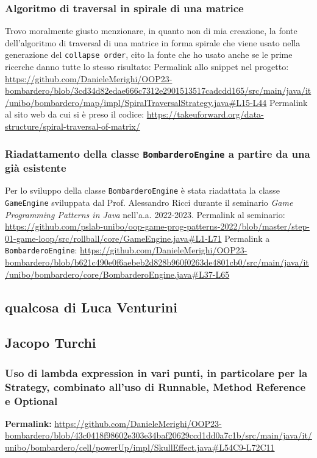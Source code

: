 \documentclass[a4paper,12pt]{report}
\begin{document}
\subsubsection{Algoritmo di traversal in spirale di una matrice}
Trovo moralmente giusto menzionare, in quanto non di mia creazione, la fonte dell'algoritmo di traversal di una matrice in forma spirale che viene usato nella generazione del \texttt{collapse order}, cito la fonte che ho usato anche se le prime ricerche danno tutte lo stesso risultato:
\newline
Permalink allo snippet nel progetto: \url{https://github.com/DanieleMerighi/OOP23-bombardero/blob/3cd34d82edae666c7312e2901513517cadcdd165/src/main/java/it/unibo/bombardero/map/impl/SpiralTraversalStrategy.java#L15-L44}
\newline
Permalink al sito web da cui si è preso il codice: \url{https://takeuforward.org/data-structure/spiral-traversal-of-matrix/}

\subsubsection{Riadattamento della classe \texttt{BombarderoEngine} a partire da una già esistente}
Per lo sviluppo della classe \texttt{BombarderoEngine} è stata riadattata la classe \texttt{GameEngine} sviluppata dal Prof. Alessandro Ricci durante il seminario \textit{Game Programming Patterns in Java} nell'a.a. 2022-2023.
\newline
Permalink al seminario: \url{https://github.com/pslab-unibo/oop-game-prog-patterns-2022/blob/master/step-01-game-loop/src/rollball/core/GameEngine.java#L1-L71}
\newline
Permalink a \texttt{BombarderoEngine}: \url{https://github.com/DanieleMerighi/OOP23-bombardero/blob/b621c490e0f6aebeb2d828b960f0263de4801cb0/src/main/java/it/unibo/bombardero/core/BombarderoEngine.java#L37-L65}

\subsection{qualcosa di Luca Venturini}

\subsection{Jacopo Turchi}

\subsubsection{Uso di lambda expression in vari punti, in particolare per la Strategy, combinato all'uso di Runnable, Method Reference e Optional}
\textbf{Permalink:} \url{https://github.com/DanieleMerighi/OOP23-bombardero/blob/43c0418f98602e303e34baf20629ccd1dd0a7c1b/src/main/java/it/unibo/bombardero/cell/powerUp/impl/SkullEffect.java#L54C9-L72C11}
\end{document}
